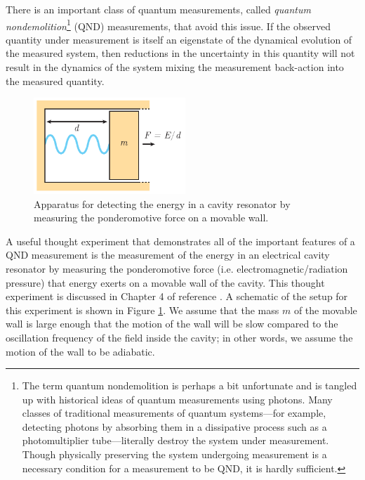 There is an important class of quantum measurements, called \textit{quantum nondemolition}\footnote{The term quantum nondemolition is perhaps a bit unfortunate and is tangled up with historical ideas of quantum measurements using photons.  Many classes of traditional measurements of quantum systems---for example, detecting photons by absorbing them in a dissipative process such as a photomultiplier tube---literally destroy the system under measurement.  Though physically preserving the system undergoing measurement is a necessary condition for a measurement to be QND, it is hardly sufficient.}
(QND) measurements, that avoid this issue.  If the observed quantity under measurement is itself an eigenstate of the dynamical evolution of the measured system, then reductions in the uncertainty in this quantity will not result in the dynamics of the system mixing the measurement back-action into the measured quantity.
\begin{figure}
\begin{center}
	\includegraphics[width = 2.25in]{qmeas_chapter/ponder}
\end{center}
\caption[Ponderomotive probe for energy]{Apparatus for detecting the energy in a cavity resonator by measuring the ponderomotive force on a movable wall.}
\label{fig:ponder}
\end{figure}
A useful thought experiment that demonstrates all of the important features of a QND measurement is the measurement of the energy in an electrical cavity resonator by measuring the ponderomotive force (i.e. electromagnetic/radiation pressure) that energy exerts on a movable wall of the cavity.  This thought experiment is discussed in Chapter 4 of reference \cite{Braginsky1992}.  A schematic of the setup for this experiment is shown in Figure \ref{fig:ponder}.  We assume that the mass $m$ of the movable wall is large enough that the motion of the wall will be slow compared to the oscillation frequency of the field inside the cavity; in other words, we assume the motion of the wall to be adiabatic.

